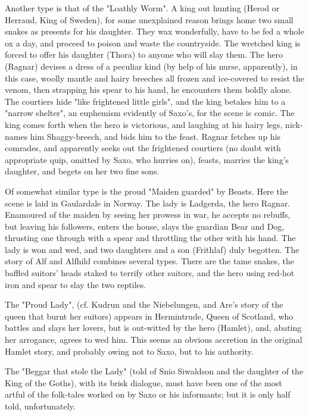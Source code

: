 \documentclass[10pt,a4paper]{report}
\begin{document}
Another type is that of the "Loathly Worm". A king out hunting (Herod or Herraud, King of Sweden), for some unexplained reason brings home two small snakes as presents for his daughter. They wax wonderfully, have to be fed a whole ox a day, and proceed to poison and waste the countryside. The wretched king is forced to offer his daughter (Thora) to anyone who will slay them. The hero (Ragnar) devises a dress of a peculiar kind (by help of his nurse, apparently), in this case, woolly mantle and hairy breeches all frozen and ice-covered to resist the venom, then strapping his spear to his hand, he encounters them boldly alone. The courtiers hide "like frightened little girls", and the king betakes him to a "narrow shelter", an euphemism evidently of Saxo's, for the scene is comic. The king comes forth when the hero is victorious, and laughing at his hairy legs, nick-names him Shaggy-breech, and bids him to the feast. Ragnar fetches up his comrades, and apparently seeks out the frightened courtiers (no doubt with appropriate quip, omitted by Saxo, who hurries on), feasts, marries the king's daughter, and begets on her two fine sons.

Of somewhat similar type is the proud "Maiden guarded" by Beasts. Here the scene is laid in Gaulardale in Norway. The lady is Ladgerda, the hero Ragnar. Enamoured of the maiden by seeing her prowess in war, he accepts no rebuffs, but leaving his followers, enters the house, slays the guardian Bear and Dog, thrusting one through with a spear and throttling the other with his hand. The lady is won and wed, and two daughters and a son (Frithlaf) duly begotten. The story of Alf and Alfhild combines several types. There are the tame snakes, the baffled suitors' heads staked to terrify other suitors, and the hero using red-hot iron and spear to slay the two reptiles.

The "Proud Lady", (cf. Kudrun and the Niebelungen, and Are's story of the queen that burnt her suitors) appears in Hermintrude, Queen of Scotland, who battles and slays her lovers, but is out-witted by the hero (Hamlet), and, abating her arrogance, agrees to wed him. This seems an obvious accretion in the original Hamlet story, and probably owing not to Saxo, but to his authority.

The "Beggar that stole the Lady" (told of Snio Siwaldson and the daughter of the King of the Goths), with its brisk dialogue, must have been one of the most artful of the folk-tales worked on by Saxo or his informants; but it is only half told, unfortunately.
\end{document}

